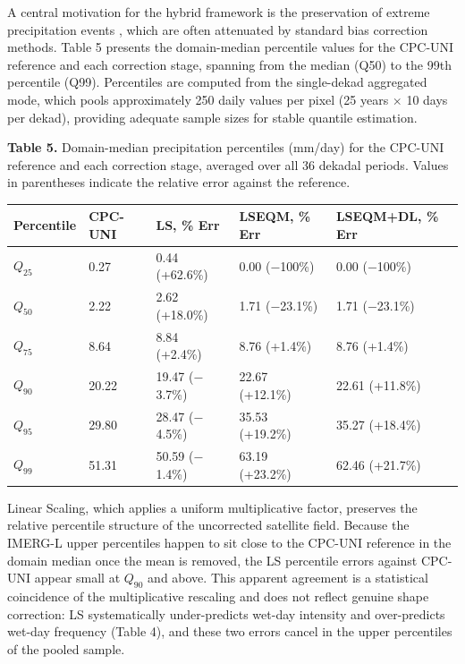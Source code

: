 \documentclass[remotesensing,article,submit,pdftex,moreauthors]{Definitions/mdpi}
\begin{document}
A central motivation for the hybrid framework is the preservation of
extreme precipitation events \cite{ref46}, which are often attenuated by
standard bias correction methods. Table 5 presents the domain-median
percentile values for the CPC-UNI reference and each correction stage,
spanning from the median (Q50) to the 99th percentile (Q99). Percentiles
are computed from the single-dekad aggregated mode, which pools
approximately 250 daily values per pixel (25 years \(\times\) 10 days
per dekad), providing adequate sample sizes for stable quantile
estimation.

\textbf{Table 5.} Domain-median precipitation percentiles (mm/day) for
the CPC-UNI reference and each correction stage, averaged over all 36
dekadal periods. Values in parentheses indicate the relative error
against the reference.

\begin{longtable}[]{@{}lllll@{}}
\toprule\noalign{}
Percentile & CPC-UNI & LS, \% Err & LSEQM, \% Err & LSEQM+DL, \% Err \\
\midrule\noalign{}
\endhead
\bottomrule\noalign{}
\endlastfoot
\(Q_{25}\) & 0.27 & 0.44 (+62.6\%) & 0.00 ($-$100\%) & 0.00 ($-$100\%) \\
\(Q_{50}\) & 2.22 & 2.62 (+18.0\%) & 1.71 ($-$23.1\%) & 1.71 ($-$23.1\%) \\
\(Q_{75}\) & 8.64 & 8.84 (+2.4\%) & 8.76 (+1.4\%) & 8.76 (+1.4\%) \\
\(Q_{90}\) & 20.22 & 19.47 ($-$3.7\%) & 22.67 (+12.1\%) & 22.61 (+11.8\%) \\
\(Q_{95}\) & 29.80 & 28.47 ($-$4.5\%) & 35.53 (+19.2\%) & 35.27 (+18.4\%) \\
\(Q_{99}\) & 51.31 & 50.59 ($-$1.4\%) & 63.19 (+23.2\%) & 62.46 (+21.7\%) \\
\end{longtable}

Linear Scaling, which applies a uniform multiplicative factor, preserves
the relative percentile structure of the uncorrected satellite field.
Because the IMERG-L upper percentiles happen to sit close to the CPC-UNI
reference in the domain median once the mean is removed, the LS
percentile errors against CPC-UNI appear small at \(Q_{90}\) and above.
This apparent agreement is a statistical coincidence of the
multiplicative rescaling and does not reflect genuine shape correction:
LS systematically under-predicts wet-day intensity and over-predicts
wet-day frequency (Table 4), and these two errors cancel in the upper
percentiles of the pooled sample.
\end{document}
